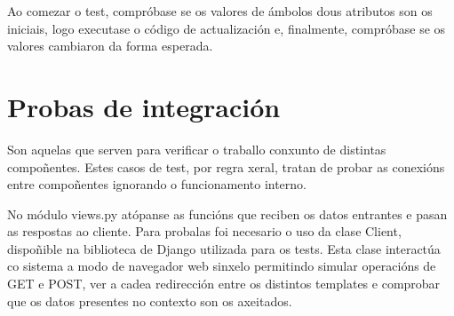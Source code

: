 Ao comezar o test, compróbase se os valores de ámbolos dous atributos son os iniciais, logo executase o código de actualización e, finalmente, compróbase se os valores cambiaron da forma esperada.

\section{Probas de integración}

Son aquelas que serven para verificar o traballo conxunto de distintas compoñentes. Estes casos de test, por regra xeral, tratan de probar as conexións entre compoñentes ignorando o funcionamento interno\cite{tests}.

No módulo views.py atópanse as funcións que reciben os datos entrantes e pasan as respostas ao cliente. Para probalas foi necesario o uso da clase Client, dispoñible na biblioteca de Django utilizada para os tests. Esta clase interactúa co sistema a modo de navegador web sinxelo permitindo simular operacións de GET e POST, ver a cadea redirección entre os distintos templates e comprobar que os datos presentes no contexto son os axeitados.

